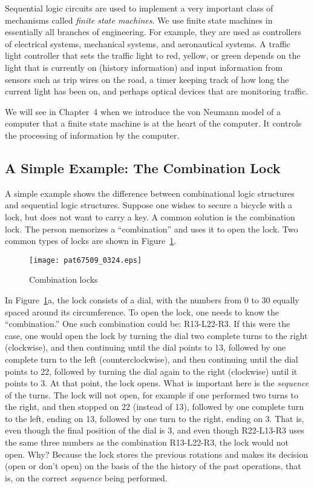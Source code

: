 \documentclass{patt}
\begin{document}
Sequential logic circuits are used to implement a very important class
of mechanisms called {\em finite state machines}.  We use finite state
machines in essentially all branches of engineering.  For example,
they are used as controllers of electrical systems, mechanical
systems, and aeronautical systems.  A traffic light
controller that sets the traffic light to red, yellow, or green
depends on the light that is currently on (history information) and
input information from sensors such as trip wires on the road, 
a timer keeping track of how long the current light has been on, and perhaps 
optical devices that are monitoring traffic.

We will see in Chapter~4 when we introduce the von Neumann model of a
computer that a finite state machine is at the heart of the
computer.  It controls the processing of information by the computer.

\subsection{A Simple Example: The Combination Lock}

A simple example shows the difference between combinational logic
structures and sequential logic structures.  Suppose one wishes to
secure a bicycle with a lock, but does not want to carry a key.  A
common solution is the combination lock.  The person memorizes a
``combination'' and uses it to open the lock.  Two common types of
locks are shown in Figure~\ref{fig:combination_locks}.

\begin{figure}
\centerline{\texttt{[image: pat67509\_0324.eps]}}
\caption{Combination locks}\label{fig:combination_locks}
\vspace{-6pt}
\end{figure}

In Figure~\ref{fig:combination_locks}a, the lock consists of a dial, with 
the numbers from 0 to 30 equally spaced around its circumference.  To open the
lock, one needs to know the ``combination.''  One such combination
could be: R13-L22-R3.  If this were the case, one would open the
lock by turning the dial two complete turns to the right (clockwise), and then
continuing until the dial points to 13, followed by one complete turn to the 
left (counterclockwise), and then continuing until the dial points to 22,
followed by turning the dial again to the right (clockwise) until it points to
3.  At that point, the lock opens.  What is important here is the
{\em sequence} of the turns.  The lock will not open, for example
if one performed two turns to the right, and then stopped on 22 (instead of 13),
followed by one complete turn to the left, ending on 13, followed by 
one turn to the right, ending on 3. That is, even though the
final position of the dial is 3, and even though R22-L13-R3 uses the same
three numbers as the combination R13-L22-R3, the lock would not open.  Why?
Because the lock stores the previous rotations and makes its
decision (open or don't open) on the basis of the the history of the past 
operations, that is, on the correct {\em sequence} being performed.
\end{document}
